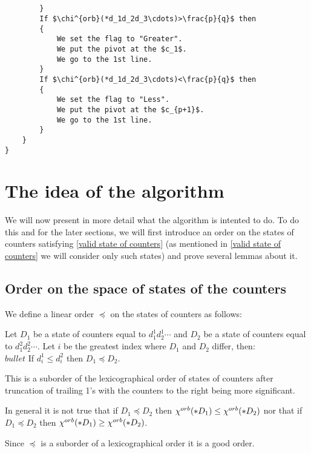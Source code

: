 \begin{lstlisting}[firstnumber=1,consecutivenumbers=true]
            
            
        }
        If $\chi^{orb}(*d_1d_2d_3\cdots)>\frac{p}{q}$ then  
        {
            We set the flag to "Greater".
            We put the pivot at the $c_1$. 
            We go to the 1st line.
        } 
        If $\chi^{orb}(*d_1d_2d_3\cdots)<\frac{p}{q}$ then
        {
            We set the flag to "Less".
            We put the pivot at the $c_{p+1}$.
            We go to the 1st line.
        } 
    }
}
\end{lstlisting}
\section{The idea of the algorithm}\label{the idea of the algoritm}
We will now present in more detail what the algorithm is intented to do. 
To do this and for the later sections, we will first introduce an order on the states 
of counters satisfying \ref{valid state of counters} (as mentioned in 
\ref{valid state of counters} we will consider only such states) and prove several lemmas about it. 
\subsection{Order on the space of states of the counters}
\begin{definition}
We define a linear order $\preceq$ on the states of counters as follows:

Let $D_1$ be a state of counters equal to $d_1^1d_2^1\cdots$ and $D_2$ be a state of counters 
equal to $d_1^2d_2^2\cdots$. Let $i$ be the greatest index where $D_1$ and $D_2$ differ, then:\\
$bullet$ If $d_i^1 \leq d_i^2$ then $D_1 \preceq D_2$. 
\end{definition}

This is a suborder of the lexicographical order 
of states of counters after truncation of trailing 1's 
with the counters to the right being more significant. 

\begin{observation}
In general it is not true that if $D_1 \preceq D_2$ then 
${\chi^{orb}(*D_1)} \leq {\chi^{orb}(*D_2)}$ nor that if $D_1 \preceq D_2$ then 
${\chi^{orb}(*D_1)} \geq {\chi^{orb}(*D_2)}$.
\end{observation}

\begin{observation}\label{good lexicographical order}
Since $\preceq$ is a suborder of a lexicographical order it is a good order. 
\end{observation}

